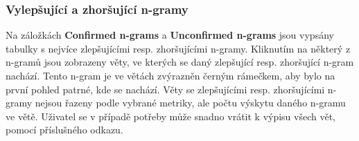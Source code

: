 \subsubsection{Vylepšující a zhoršující \mbox{n-gramy}}
Na záložkách \textbf{Confirmed \mbox{n-grams}} a \textbf{Unconfirmed \mbox{n-grams}} jsou vypsány tabulky s nejvíce zlepšujícími resp. zhoršujícími \mbox{n-gramy}.
Kliknutím na některý z \mbox{n-gramů} jsou zobrazeny věty,
  ve kterých se daný zlepšující resp. zhoršující \mbox{n-gram} nachází.
Tento \mbox{n-gram} je ve větách zvýrazněn černým rámečkem,
  aby bylo na první pohled patrné,
  kde se nachází.
Věty se zlepšujícími resp. zhoršujícími \mbox{n-gramy} nejsou řazeny podle vybrané metriky,
  ale počtu výskytu daného \mbox{n-gramu} ve větě.
Uživatel se v případě potřeby může snadno vrátit k výpisu všech vět, pomocí příslušného odkazu.



